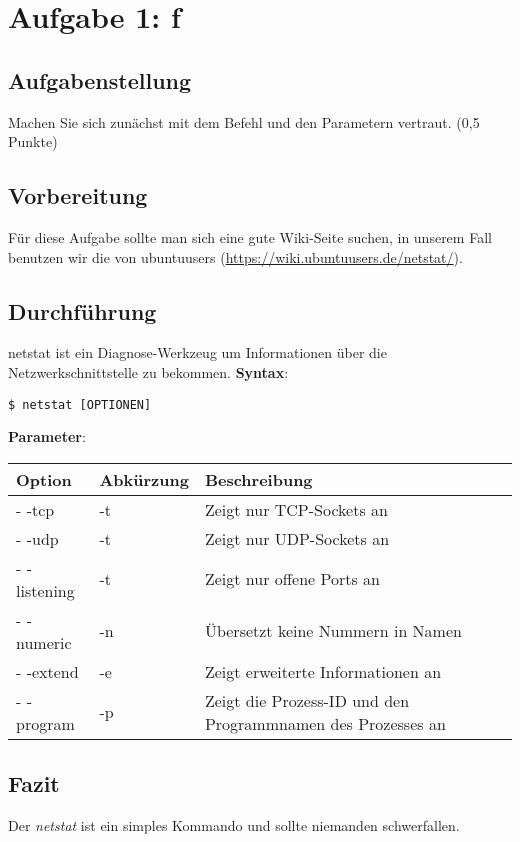 \newpage

\section{Aufgabe 1: f}

\subsection{Aufgabenstellung}
Machen Sie sich zunächst mit dem Befehl und den Parametern vertraut. (0,5 Punkte)

\subsection{Vorbereitung}
Für diese Aufgabe sollte man sich eine gute Wiki-Seite suchen, in unserem Fall benutzen wir die von ubuntuusers (\url{https://wiki.ubuntuusers.de/netstat/}).

\subsection{Durchführung}
netstat ist ein Diagnose-Werkzeug um Informationen über die Netzwerkschnittstelle zu bekommen.
\textbf{Syntax}: 
\begin{lstlisting}
$ netstat [OPTIONEN]
\end{lstlisting}
\textbf{Parameter}: 
\begin{table}[H]
	\tablestyle
	\begin{tabular}{lll}
		\toprule
			Option & Abkürzung & Beschreibung \tabularnewline
				
		\midrule
			- -tcp & -t & Zeigt nur TCP-Sockets an\tabularnewline
			- -udp & -t & Zeigt nur UDP-Sockets an\tabularnewline
			- -listening & -t & Zeigt nur offene Ports an\tabularnewline
			- -numeric & -n & Übersetzt keine Nummern in Namen\tabularnewline
			- -extend & -e & Zeigt erweiterte Informationen an\tabularnewline
			- -program & -p & Zeigt die Prozess-ID und den Programmnamen des Prozesses an\tabularnewline
			
	\end{tabular}
\end{table}
 
\subsection{Fazit}
Der \textit{netstat} ist ein simples Kommando und sollte niemanden schwerfallen.

\newpage

